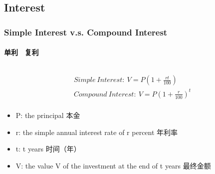 \documentclass[
	11pt, %
	handout,
]{beamer}
\begin{document}

\subsection{Interest}

\begin{frame}
	\frametitle{Simple Interest v.s. Compound Interest}
	\framesubtitle{单利 \ 复利 }

	\begin{columns}[t] 
		\begin{column}{0.5\textwidth} %
			\begin{equation*}
			  \begin{aligned}
			  	&Simple\ Interest:\	V =P(1 + \frac{rt}{100})\\
			  	&Compound\ Interest:\	V =P(1 + \frac{r}{100})^t\\
			  \end{aligned}
			\end{equation*}
			\begin{itemize}
				\item P: the principal 本金 
			  \item		r:  the simple annual interest rate of r  percent  年利率
			  \item		t:  t years  时间（年）
			  \item		V:  the value V of the investment at the end of t years  最终金额
			\end{itemize}
		\end{column}


\end{columns}
\end{frame}
\end{document}
